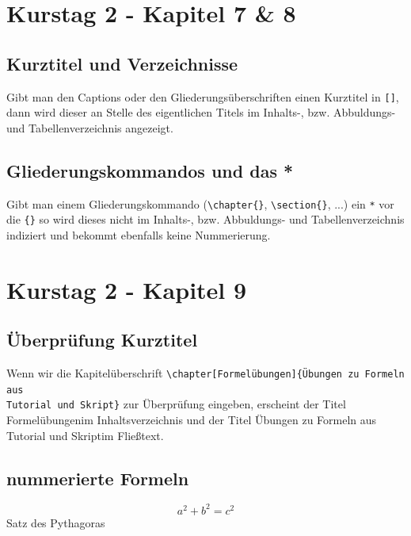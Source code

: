 \documentclass[
12pt,
ngerman
]{scrreprt}
\begin{document}
\chapter[Blatt 4]{Kurstag 2 - Kapitel 7 \& 8}
\label{cha:chap7-8}
\label{blatt:4}

\section{Kurztitel und Verzeichnisse}
\label{sec:kurztitel}
Gibt man den Captions oder den Gliederungsüberschriften einen Kurztitel in \verb![]!, dann wird dieser an Stelle des eigentlichen Titels im Inhalts-, bzw. Abbuldungs- und Tabellenverzeichnis angezeigt.

\section{Gliederungskommandos und das *}
\label{sec:*}
Gibt man einem Gliederungskommando (\verb!\chapter{}!, \verb!\section{}!, ...) ein \verb!*! vor die \verb!{}! so wird dieses nicht im Inhalts-, bzw. Abbuldungs- und Tabellenverzeichnis indiziert und bekommt ebenfalls keine Nummerierung.

\chapter[Blatt 5]{Kurstag 2 - Kapitel 9}
\label{cha:chap9}
\label{blatt:5}

\section{Überprüfung Kurztitel}
\label{sec:proof}
Wenn wir die Kapitelüberschrift \verb!\chapter[Formelübungen]{Übungen zu Formeln aus! \\ \verb!Tutorial und Skript}! zur Überprüfung eingeben, erscheint der Titel \glqq Formelübungen\grqq \:im Inhaltsverzeichnis und der Titel \glqq Übungen zu Formeln aus Tutorial und Skript\grqq \:im Fließtext.

\section{nummerierte Formeln}
\label{sec:nummerierte-formeln}
\centering
\begin{equation}
  \label{eq:pythagoras}
  a^2+b^2=c^2
\end{equation}
Satz des Pythagoras
\end{document}
